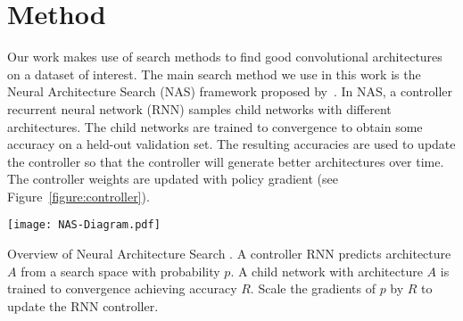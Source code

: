 \documentclass[10pt,twocolumn,letterpaper]{article}
\begin{document}
\section{Method}\label{sec:search_space}%
Our work makes use of search methods to find good convolutional architectures on a dataset of interest. The main search method we use in this work is the Neural Architecture Search (NAS) framework proposed by~\cite{zoph2017neural}. In NAS, a controller recurrent neural network (RNN) samples child networks with different architectures. The child networks are trained to convergence to obtain some accuracy on a held-out validation set. The resulting accuracies are used to update the controller so that the controller will generate better architectures over time. The controller weights are updated with policy gradient (see Figure~\ref{figure:controller}). %
\begin{center}
\texttt{[image: NAS-Diagram.pdf]}
\caption{Overview of Neural Architecture Search \cite{zoph2017neural}. A controller RNN predicts architecture $A$ from a search space with probability $p$. A child network with architecture $A$ is trained to convergence achieving accuracy $R$. Scale the gradients of $p$ by $R$ to update the RNN controller.}
\label{figure:controller}
\end{center}
\end{document}
